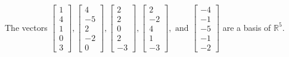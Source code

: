 \begin{exercise}
\begin{exerciseStatement}
  \end{exerciseStatement}
  \begin{exerciseAnswer}
   The vectors \(\left[\begin{array}{r}
1 \\
4 \\
1 \\
0 \\
3
\end{array}\right] , \left[\begin{array}{r}
4 \\
-5 \\
2 \\
-2 \\
0
\end{array}\right] , \left[\begin{array}{r}
2 \\
2 \\
0 \\
2 \\
-3
\end{array}\right] , \left[\begin{array}{r}
2 \\
-2 \\
4 \\
1 \\
-3
\end{array}\right] , \text{ and } \left[\begin{array}{r}
-4 \\
-1 \\
-5 \\
-1 \\
-2
\end{array}\right]\) 
  	 are  a basis of \(\mathbb{R}^5\).
  


  \end{exerciseAnswer}
\end{exercise}